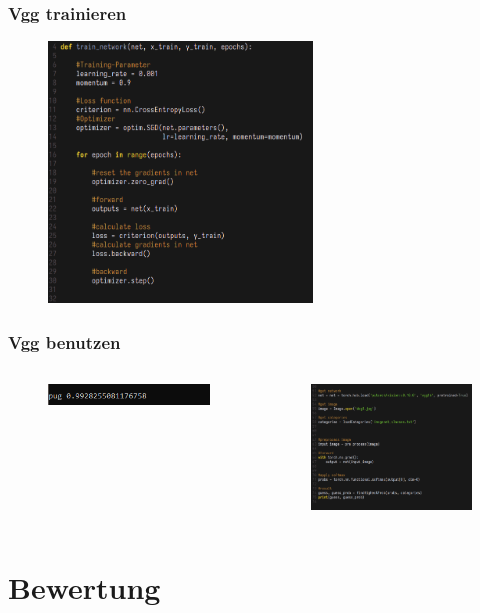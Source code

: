 \documentclass[10pt]{beamer}
\begin{document}
\begin{frame}
\frametitle{Vgg trainieren}
\begin{figure}
		\includegraphics[width=70mm]{train.png}
	\end{figure}
\end{frame}

\begin{frame}
\frametitle{Vgg benutzen}
\begin{columns}
	\begin{column}{.5\textwidth}
		\begin{figure}
			\includegraphics[width=55mm]{use_output.png}
		\end{figure}
	\end{column}
	\begin{column}{.5\textwidth}
		\begin{figure}
			\includegraphics[width=55mm]{use.png}
		\end{figure}
	\end{column}
\end{columns}
\end{frame}

\section{Bewertung}
\end{document}
